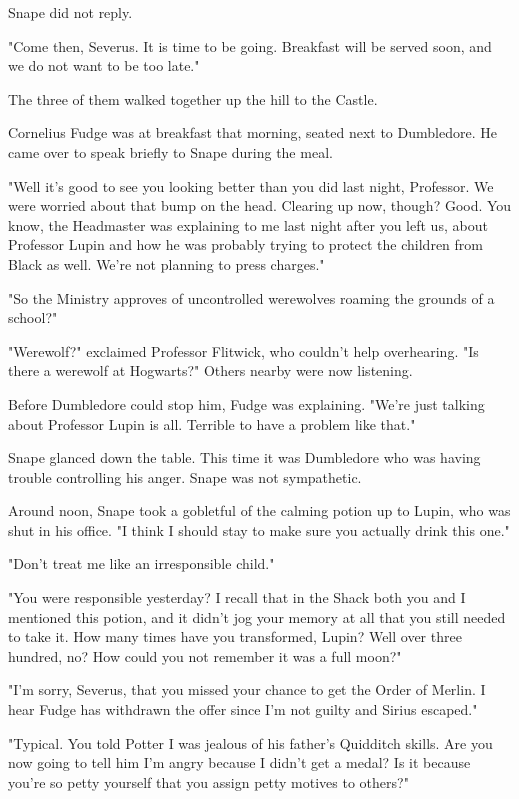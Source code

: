 Snape did not reply.

"Come then, Severus. It is time to be going. Breakfast will be served soon, and we do not want to be too late."

The three of them walked together up the hill to the Castle.

Cornelius Fudge was at breakfast that morning, seated next to Dumbledore. He came over to speak briefly to Snape during the meal.

"Well it's good to see you looking better than you did last night, Professor. We were worried about that bump on the head. Clearing up now, though? Good. You know, the Headmaster was explaining to me last night after you left us, about Professor Lupin and how he was probably trying to protect the children from Black as well. We're not planning to press charges."

"So the Ministry approves of uncontrolled werewolves roaming the grounds of a school?"

"Werewolf?" exclaimed Professor Flitwick, who couldn't help overhearing. "Is there a werewolf at Hogwarts?" Others nearby were now listening.

Before Dumbledore could stop him, Fudge was explaining. "We're just talking about Professor Lupin is all. Terrible to have a problem like that."

Snape glanced down the table. This time it was Dumbledore who was having trouble controlling his anger. Snape was not sympathetic.

Around noon, Snape took a gobletful of the calming potion up to Lupin, who was shut in his office. "I think I should stay to make sure you actually drink this one."

"Don't treat me like an irresponsible child."

"You were responsible yesterday? I recall that in the Shack both you and I mentioned this potion, and it didn't jog your memory at all that you still needed to take it. How many times have you transformed, Lupin? Well over three hundred, no? How could you not remember it was a full moon?"

"I'm sorry, Severus, that you missed your chance to get the Order of Merlin. I hear Fudge has withdrawn the offer since I'm not guilty and Sirius escaped."

"Typical. You told Potter I was jealous of his father's Quidditch skills. Are you now going to tell him I'm angry because I didn't get a medal? Is it because you're so petty yourself that you assign petty motives to others?"

